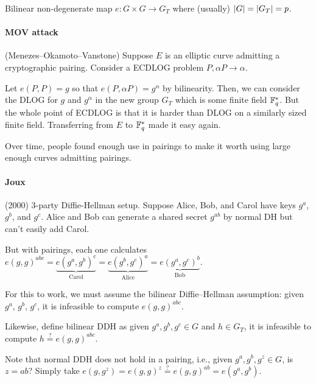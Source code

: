 \documentclass[notes]{agony}
\begin{document}
\begin{defn}
  Bilinear non-degenerate map $e : G \times G \to G_T$
  where (usually) $\abs{G} = \abs{G_T} = p$.
\end{defn}\spewnotes

\paragraph{MOV attack} (Menezes--Okamoto--Vanstone)
Suppose $E$ is an elliptic curve admitting a cryptographic pairing.
Consider a ECDLOG problem $P, \alpha P \to \alpha$.

Let $e(P,P) = g$ so that $e(P,\alpha P) = g^\alpha$ by bilinearity.
Then, we can consider the DLOG for $g$ and $g^\alpha$ in the new group $G_T$
which is some finite field $\mathbb{F}_q^*$.
But the whole point of ECDLOG is that it is harder than DLOG on a similarly sized finite field.
Transferring from $E$ to $\mathbb{F}_q^*$ made it easy again.

Over time, people found enough use in pairings to make it worth using
large enough curves admitting pairings.

\paragraph{Joux} (2000) 3-party Diffie-Hellman setup.
Suppose Alice, Bob, and Carol have keys $g^a$, $g^b$, and $g^c$.
Alice and Bob can generate a shared secret $g^{ab}$ by normal DH
but can't easily add Carol.

But with pairings, each one calculates $e(g,g)^{abc} 
= \underbrace{e(g^a,g^b)^c}_{\text{Carol}}
= \underbrace{e(g^b,g^c)^a}_{\text{Alice}}
= \underbrace{e(g^a,g^c)^b}_{\text{Bob}}$.

For this to work, we must assume the bilinear Diffie--Hellman assumption:
given $g^a$, $g^b$, $g^c$, it is infeasible to compute $e(g,g)^{abc}$.

Likewise, define bilinear DDH as given $g^a,g^b,g^c \in G$ and $h \in G_T$,
it is infeasible to compute $h \stackrel{?}{=} e(g,g)^{abc}$.

Note that normal DDH does not hold in a pairing, i.e.,
given $g^a,g^b,g^z \in G$, is $z = ab$?
Simply take $e(g,g^z) = e(g,g)^z \stackrel{?}{=} e(g,g)^{ab} = e(g^a,g^b)$.
\end{document}
